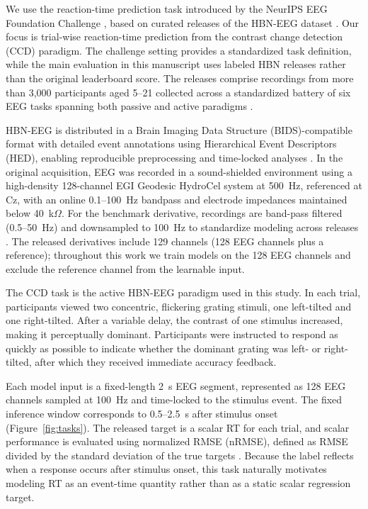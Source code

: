 \documentclass[12pt]{article}
\begin{document}
We use the reaction-time prediction task introduced by the NeurIPS EEG Foundation Challenge \citep{EEGChallengeWebsite2025,EEGFoundationChallengeArxiv2025}, based on curated releases of the HBN-EEG dataset \citep{Shirazi2024HBNEEG}. Our focus is trial-wise reaction-time prediction from the contrast change detection (CCD) paradigm. The challenge setting provides a standardized task definition, while the main evaluation in this manuscript uses labeled HBN releases rather than the original leaderboard score. The releases comprise recordings from more than 3{,}000 participants aged 5--21 collected across a standardized battery of six EEG tasks spanning both passive and active paradigms \citep{Shirazi2024HBNEEG,EEGChallengeWebsite2025}.

HBN-EEG is distributed in a Brain Imaging Data Structure (BIDS)-compatible format with detailed event annotations using Hierarchical Event Descriptors (HED), enabling reproducible preprocessing and time-locked analyses \citep{Shirazi2024HBNEEG}. In the original acquisition, EEG was recorded in a sound-shielded environment using a high-density 128-channel EGI Geodesic HydroCel system at 500~Hz, referenced at Cz, with an online 0.1--100~Hz bandpass and electrode impedances maintained below 40~k$\Omega$. For the benchmark derivative, recordings are band-pass filtered (0.5--50~Hz) and downsampled to 100~Hz to standardize modeling across releases \citep{EEGChallengeWebsite2025}. The released derivatives include 129 channels (128 EEG channels plus a reference); throughout this work we train models on the 128 EEG channels and exclude the reference channel from the learnable input.

The CCD task is the active HBN-EEG paradigm used in this study. In each trial, participants viewed two concentric, flickering grating stimuli, one left-tilted and one right-tilted. After a variable delay, the contrast of one stimulus increased, making it perceptually dominant. Participants were instructed to respond as quickly as possible to indicate whether the dominant grating was left- or right-tilted, after which they received immediate accuracy feedback.

Each model input is a fixed-length 2~s EEG segment, represented as 128 EEG channels sampled at 100~Hz and time-locked to the stimulus event. The fixed inference window corresponds to 0.5--2.5~s after stimulus onset (Figure~\ref{fig:tasks}). The released target is a scalar RT for each trial, and scalar performance is evaluated using normalized RMSE (nRMSE), defined as RMSE divided by the standard deviation of the true targets \citep{EEGChallengeWebsite2025}. Because the label reflects when a response occurs after stimulus onset, this task naturally motivates modeling RT as an event-time quantity rather than as a static scalar regression target.
\end{document}

